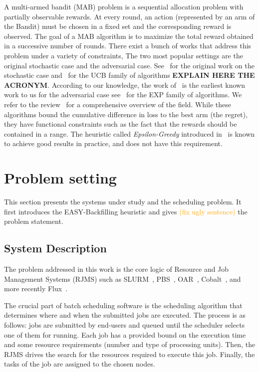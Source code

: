 \documentclass[sigconf]{acmart}
\begin{document}
A multi-armed bandit (MAB) problem is a sequential allocation problem with
partially observable rewards. At every round, an action (represented by 
an arm of the Bandit) must be chosen
in a fixed set and the corresponding reward is observed. The goal of a MAB
algorithm is to maximize the total reward obtained in a successive 
number of rounds.
There exist a bunch of works that address this problem under a variety of
constraints, The two most popular settings are the original stochastic  case
and the adversarial case. See~\cite{thompson} for the original work on the
stochastic case and~\cite{Auer2002} for the UCB family of algorithms 
\textbf{EXPLAIN HERE THE ACRONYM}.
According to our knowledge, the work
of~\cite{Banos} is the earliest known work to us for the adversarial case
see~\cite{nonstoch} for the EXP family of algorithms. We refer to the
review~\cite{bubnow} for a comprehensive overview of the field. While these
algorithms bound the cumulative difference in loss to the best arm (the
regret), they have functional constraints such as the fact that the rewards
should be contained in a range. The heuristic called
\textit{Epsilon-Greedy} introduced in~\cite{Auer2002} is known to 
achieve good results in practice, and does not have
this requirement.


\section{Problem setting}
\label{sec:problem_setting}

This section presents the systems under study and the scheduling problem.  It
first introduces the EASY-Backfilling heuristic and gives
\textcolor{orange}{(fix ugly sentence)} the problem statement.

\subsection{System Description}
\label{sub:sysdesc}

The problem addressed in this work is the core logic of Resource and Job
Management Systems (RJMS) such as SLURM~\cite{SLURMdocSCHED}, PBS~\cite{PBSdoc},
OAR~\cite{capit2005batch}, Cobalt~\cite{Cobalt}, and more recently Flux~\cite{flux2014}.

The crucial part of batch scheduling software is the scheduling algorithm that determines
where and when the submitted jobs are executed. The process is as follows: jobs
are submitted by end-users and queued until the scheduler selects one of them
for running. Each job has a provided bound on the execution time and some
resource requirements (number and type of processing units). Then, the RJMS
drives the search for the resources required to execute this job. Finally, the
tasks of the job are assigned to the chosen nodes.
\end{document}
